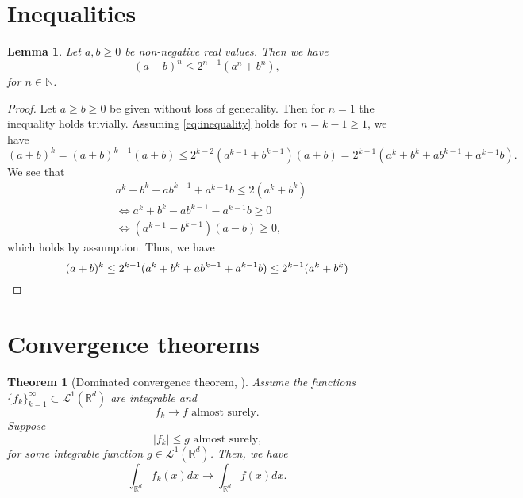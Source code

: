 \documentclass[12pt]{article}
\newtheorem{theorem}{Theorem}[section]
\newtheorem{lemma}[lemma]{Lemma}
\theoremstyle{definition}
\numberwithin{equation}{section}
\newcommand{\N}{\mathbb{N}}
\newcommand{\R}{\mathbb{R}}
\newcommand{\CL}{\mathcal{L}}
\begin{document}
\printbibliography

\appendix
\section{Inequalities}
\begin{lemma}
  \label{lemma:inequality}
  Let $a,b \geq 0$ be non-negative real values. Then we have
  \begin{equation}
    \label{eq:inequality}
    \left(a+b\right)^n \leq 2^{n-1} \left( a^n + b^n \right),
  \end{equation}
  for $n \in \N$.
\end{lemma}
\begin{proof}
  Let $a \geq b \geq 0$ be given without loss of generality. Then for $n = 1$ the inequality holds trivially.
  Assuming \eqref{eq:inequality} holds for $n = k-1 \geq 1$, we have
  \begin{equation*}
    (a+b)^k = (a+b)^{k-1}(a+b) \leq 2^{k-2} (a^{k-1} + b^{k-1}) (a+b) = 2^{k-1}(a^k+b^k + ab^{k-1} + a^{k-1}b).
  \end{equation*}
  We see that
  \begin{align*}
    &a^k+b^k + ab^{k-1} + a^{k-1}b \leq 2 (a^k + b^k) \\
    &\iff a^k + b^k -ab^{k-1} - a^{k-1}b \geq 0 \\
    &\iff (a^{k-1} - b^{k-1}) (a-b) \geq 0,
  \end{align*}
  which holds by assumption. Thus, we have
  \begin{equation*}
    (a+b)^k \leq 2^{k-1}(a^k+b^k + ab^{k-1} + a^{k-1}b) \leq 2^{k-1} (a^k + b^k) \qedhere
  \end{equation*}
\end{proof}
\section{Convergence theorems}
\begin{theorem}[Dominated convergence theorem, ]
  \label{thm:dominated_convergence}
  Assume the functions $\{f_k\}_{k=1}^{\infty} \subset \CL^1(\R^d)$ are integrable and
  \begin{equation*}
    f_k \rightarrow f \text{ almost surely.}
  \end{equation*}
  Suppose
  \begin{equation*}
    |f_k| \leq g \text{ almost surely,}
  \end{equation*}
  for some integrable function $g \in \CL^1(\R^d)$. Then, we have
  \begin{equation*}
    \int_{\R^d} f_k(x) dx \rightarrow \int_{\R^d} f(x) dx.
  \end{equation*}
\end{theorem}
\end{document}
